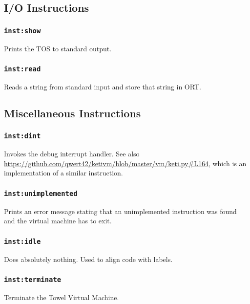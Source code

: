 \documentclass{article}
\newcommand{\inst}[1] {\texttt{inst:#1}}
\begin{document}
\subsection{I/O Instructions}

\subsubsection{\inst{show}}

Prints the TOS to standard output.

\subsubsection{\inst{read}}

Reads a string from standard input and store that string in ORT.

\subsection{Miscellaneous Instructions}

\subsubsection{\inst{dint}}

Invokes the debug interrupt handler. See also \url{https://github.com/qwert42/ketivm/blob/master/vm/keti.py#L164}, which is an implementation of a similar instruction.

\subsubsection{\inst{unimplemented}}

Prints an error message stating that an unimplemented instruction was found and the virtual machine has to exit.

\subsubsection{\inst{idle}}

Does absolutely nothing. Used to align code with labels.

\subsubsection{\inst{terminate}}

Terminate the Towel Virtual Machine.
\end{document}
